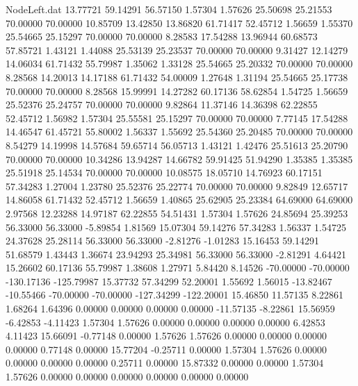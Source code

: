 \begin{filecontents}{NodeLeft.dat}
  13.77721   59.14291   56.57150     1.57304    1.57626   25.50698   25.21553   70.00000   70.00000   10.85709   13.42850
  13.86820   61.71417   52.45712     1.56659    1.55370   25.54665   25.15297   70.00000   70.00000    8.28583   17.54288
  13.96944   60.68573   57.85721     1.43121    1.44088   25.53139   25.23537   70.00000   70.00000    9.31427   12.14279
  14.06034   61.71432   55.79987     1.35062    1.33128   25.54665   25.20332   70.00000   70.00000    8.28568   14.20013
  14.17188   61.71432   54.00009     1.27648    1.31194   25.54665   25.17738   70.00000   70.00000    8.28568   15.99991
  14.27282   60.17136   58.62854     1.54725    1.56659   25.52376   25.24757   70.00000   70.00000    9.82864   11.37146
  14.36398   62.22855   52.45712     1.56982    1.57304   25.55581   25.15297   70.00000   70.00000    7.77145   17.54288
  14.46547   61.45721   55.80002     1.56337    1.55692   25.54360   25.20485   70.00000   70.00000    8.54279   14.19998
  14.57684   59.65714   56.05713     1.43121    1.42476   25.51613   25.20790   70.00000   70.00000   10.34286   13.94287
  14.66782   59.91425   51.94290     1.35385    1.35385   25.51918   25.14534   70.00000   70.00000   10.08575   18.05710
  14.76923   60.17151   57.34283     1.27004    1.23780   25.52376   25.22774   70.00000   70.00000    9.82849   12.65717
  14.86058   61.71432   52.45712     1.56659    1.40865   25.62905   25.23384   64.69000   64.69000    2.97568   12.23288
  14.97187   62.22855   54.51431     1.57304    1.57626   24.85694   25.39253   56.33000   56.33000   -5.89854    1.81569
  15.07304   59.14276   57.34283     1.56337    1.54725   24.37628   25.28114   56.33000   56.33000   -2.81276   -1.01283
  15.16453   59.14291   51.68579     1.43443    1.36674   23.94293   25.34981   56.33000   56.33000   -2.81291    4.64421
  15.26602   60.17136   55.79987     1.38608    1.27971    5.84420    8.14526  -70.00000  -70.00000 -130.17136 -125.79987
  15.37732   57.34299   52.20001     1.55692    1.56015  -13.82467  -10.55466  -70.00000  -70.00000 -127.34299 -122.20001
  15.46850   11.57135    8.22861     1.68264    1.64396    0.00000    0.00000    0.00000    0.00000  -11.57135   -8.22861
  15.56959   -6.42853   -4.11423     1.57304    1.57626    0.00000    0.00000    0.00000    0.00000    6.42853    4.11423
  15.66091   -0.77148    0.00000     1.57626    1.57626    0.00000    0.00000    0.00000    0.00000    0.77148    0.00000
  15.77204   -0.25711    0.00000     1.57304    1.57626    0.00000    0.00000    0.00000    0.00000    0.25711    0.00000
  15.87332    0.00000    0.00000     1.57304    1.57626    0.00000    0.00000    0.00000    0.00000    0.00000    0.00000

\end{filecontents}
